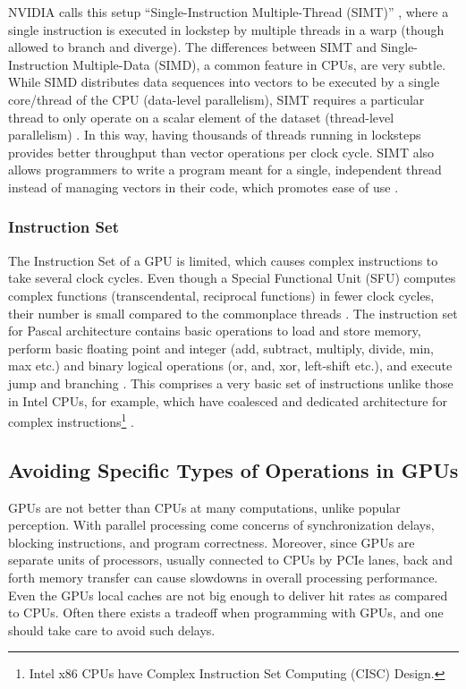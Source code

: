 NVIDIA calls this setup ``Single-Instruction Multiple-Thread (SIMT)'' \cite{CUDADocs}, where a single instruction is executed in lockstep by multiple threads in a warp (though allowed to branch and diverge). The differences between SIMT and Single-Instruction Multiple-Data (SIMD), a common feature in CPUs, are very subtle. While SIMD distributes data sequences into vectors to be executed by a single core/thread of the CPU (data-level parallelism), SIMT requires a particular thread to only operate on a scalar element of the dataset (thread-level parallelism) \cite{PattersonARM}. In this way, having thousands of threads running in locksteps provides better throughput than vector operations per clock cycle. SIMT also allows programmers to write a program meant for a single, independent thread instead of managing vectors in their code, which promotes ease of use \cite[Chapter~4]{CUDADocs}.

\subsubsection{Instruction Set}
The Instruction Set of a GPU is limited, which causes complex instructions to take several clock cycles. Even though a Special Functional Unit (SFU) computes complex functions (transcendental, reciprocal functions) in fewer clock cycles, their number is small compared to the commonplace threads \cite[Appendix~B]{PattersonARM}. The instruction set for Pascal architecture contains basic operations to load and store memory, perform basic floating point and integer (add, subtract, multiply, divide, min, max etc.) and binary logical operations (or, and, xor, left-shift etc.), and execute jump and branching \cite{DemystifyingGPU,CUDABinUtils}. This comprises a very basic set of instructions unlike those in Intel CPUs, for example, which have coalesced and dedicated architecture for complex instructions\footnote{Intel x86 CPUs have Complex Instruction Set Computing (CISC) Design.} \cite{PattersonARM}.

\subsection{Avoiding Specific Types of Operations in GPUs} \label{sec:Avoiding Specific Operations in GPUs}
GPUs are not better than CPUs at many computations, unlike popular perception. With parallel processing come concerns of synchronization delays, blocking instructions, and program correctness. Moreover, since GPUs are separate units of processors, usually connected to CPUs by PCIe lanes, back and forth memory transfer can cause slowdowns in overall processing performance. Even the GPUs local caches are not big enough to deliver hit rates as compared to CPUs. Often there exists a tradeoff when programming with GPUs, and one should take care to avoid such delays.

